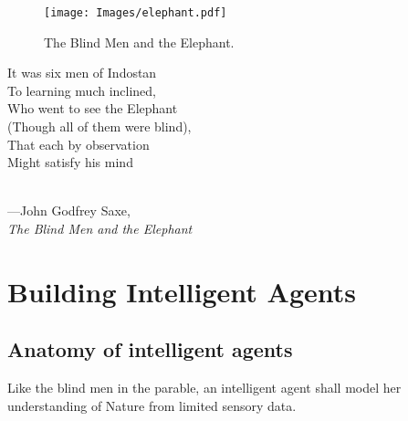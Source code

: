 \documentclass[
  letterpaper,
  12pt,
  british]{tufte-book}
\renewenvironment{quote}{
  \list{}{\leftmargin=3.5cm\topsep=0pt}
  \item\relax\small\itshape
}
{\endlist}
\theoremstyle{plain}
\theoremstyle{plain}
\theoremstyle{definition}
\theoremstyle{remark}
\begin{document}
\newpage{}

\vspace{2cm}

\hypertarget{fig-elephant}{}
\begin{figure}

\texttt{[image: Images/elephant.pdf]}

\label{fig-elephant}The Blind Men and the Elephant.

\end{figure}

\vspace{3cm}

\begin{quote}
It was six men of Indostan\\
To learning much inclined,\\
Who went to see the Elephant\\
(Though all of them were blind),\\
That each by observation\\
Might satisfy his mind\\
\strut \\
---John Godfrey Saxe,\\
\emph{The Blind Men and the Elephant}
\end{quote}

\newpage{}

\hypertarget{building-intelligent-agents}{%
\section{Building Intelligent
Agents}\label{building-intelligent-agents}}

\hypertarget{sec-anatomy_ia}{%
\subsection{Anatomy of intelligent agents}\label{sec-anatomy_ia}}

Like the blind men in the parable, an intelligent agent shall model her
understanding of Nature from limited sensory data.
\end{document}
